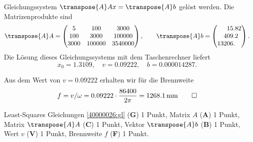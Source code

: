 \begin{loesung}
\begin{teilaufgaben}
Gleichungssystem $\transpose{A}Ax=\transpose{A}b$ gelöst werden.
Die Matrizenprodukte sind
\[
\transpose{A}A
=
\begin{pmatrix}
   5&   100&   3000\\
 100&  3000& 100000\\
3000&100000&3540000
\end{pmatrix},
\qquad
\transpose{A}b
=
\begin{pmatrix}
\phantom{000}15.82\\
\phantom{00}409.2\phantom{0}\\
13206.\phantom{00}
\end{pmatrix}.
\]
Die Lösung dieses Gleichungssystems mit dem Taschenrechner liefert
\[
x_0 = 1.3109,\quad
v=0.09222,\quad
b=0.000014287.
\]
\item
Aus dem Wert von $v=0.09222$ erhalten wir für die Brennweite
\[
f
=
v/\omega
=
0.09222\cdot \frac{86400}{2\pi}
=
1268.1\, \text{mm}
\qedhere
\]
\end{teilaufgaben}
\end{loesung}


\begin{bewertung}
Least-Squares Gleichungen \eqref{40000026:gl} ({\bf G}) 1 Punkt,
Matrix $A$ ({\bf A}) 1 Punkt,
Matrix $\transpose{A}A$ ({\bf C}) 1 Punkt,
Vektor $\transpose{A}b$ ({\bf B}) 1 Punkt,
Wert $v$ ({\bf V}) 1 Punkt,
Brennweite $f$ ({\bf F}) 1 Punkt.
\end{bewertung}
